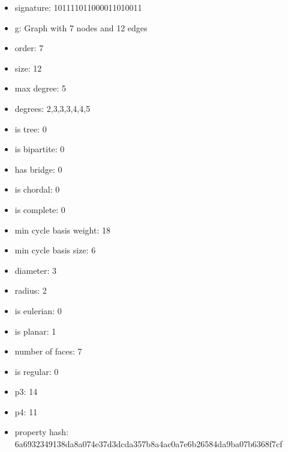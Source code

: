 \begin{itemize}
\item signature: 101111011000011010011
\item g: Graph with 7 nodes and 12 edges
\item order: 7
\item size: 12
\item max degree: 5
\item degrees: 2,3,3,3,4,4,5
\item is tree: 0
\item is bipartite: 0
\item has bridge: 0
\item is chordal: 0
\item is complete: 0
\item min cycle basis weight: 18
\item min cycle basis size: 6
\item diameter: 3
\item radius: 2
\item is eulerian: 0
\item is planar: 1
\item number of faces: 7
\item is regular: 0
\item p3: 14
\item p4: 11
\item property hash: 6a6932349138da8a074e37d3dcda357b8a4ac0a7e6b26584da9ba07b6368f7cf
\end{itemize}
\newpage
\begin{figure}
\end{figure}
